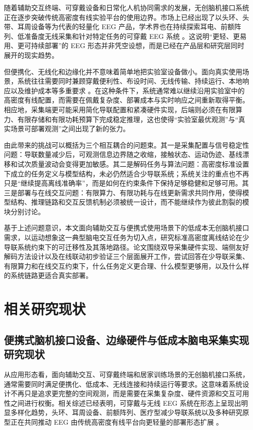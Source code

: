 随着辅助交互终端、可穿戴设备和日常化人机协同需求的发展，无创脑机接口系统正在逐步突破传统高密度有线实验平台的使用边界。市场上已经出现了以头环、头带、耳周设备等为代表的轻量化 EEG 产品，学术界也在持续探索耳电、前额阵列、低准备度无线采集和针对特定任务的可穿戴 EEG 系统 \cite{He23, Nis22, Arn20, Deb15, Bio22}。这说明“更轻、更易用、更可持续部署”的 EEG 形态并非凭空设想，而是已经在产品层和研究层同时展开的现实趋势。

但便携化、无线化和边缘化并不意味着简单地把实验室设备做小。面向真实使用场景，系统往往需要同时兼顾穿戴便利性、布设时间、无线传输、持续运行、本地响应以及维护成本等多重要求 \cite{Cas19c, Nis22, He23}。在这种条件下，系统通常难以继续沿用实验室中的高密度有线配置，而需要在佩戴复杂度、部署成本与实时响应之间重新取得平衡。相应地，采集端更可能采用简化导联配置和紧凑硬件实现，后端则必须在有限算力、有限存储和有限功耗预算下完成稳定推理，这也使得“实验室最优观测”与“真实场景可部署观测”之间出现了新的张力。

由此带来的挑战可以概括为三个相互耦合的问题束。其一是采集配置与信号稳定性问题：导联数量减少后，可观测信息边界随之收缩，接触状态、运动伪迹、基线漂移和试次质量波动会变得更加敏感。其二是解码任务与算法问题：高密度标准设置下成立的任务定义与模型结构，未必仍然适合少导联系统；系统关注的重点也不再只是“继续提高离线准确率”，而是如何在约束条件下保持足够稳健和足够可用。其三是部署与在线交互问题：有限算力、有限功耗与在线更新需求共同作用，使得模型结构、推理链路和交互反馈机制必须被统一设计，而不能继续作为彼此割裂的模块分别讨论。

基于上述问题意识，本文面向辅助交互与便携式使用场景下的低成本无创脑机接口需求，以运动想象这一典型脑电交互任务为切入点，研究标准高密度离线结论在少导联系统约束下的可迁移性及其落地路径。论文围绕双导采集硬件实现、端侧友好解码方法设计以及在线联动初步验证三个层面展开工作，尝试回答在少导联采集、有限算力和在线交互约束下，什么任务定义更合理、什么模型更够用，以及什么样的系统链路更适合真实部署。

\section{相关研究现状}
\subsection{便携式脑机接口设备、边缘硬件与低成本脑电采集实现研究现状}

从应用形态看，面向辅助交互、可穿戴终端和居家训练场景的无创脑机接口系统，通常需要同时满足便携化、低成本、无线连接和持续运行等要求。这意味着系统设计不再只是追求更完整的空间观测，而是需要在采集复杂度、硬件资源和交互可用性之间进行权衡。相关综述已经表明，可穿戴与无线 EEG 系统在形态上呈现出明显多样化趋势，头环、耳周设备、前额阵列、医疗型减少导联系统以及多种研究原型正在共同推动 EEG 由传统高密度有线平台向更轻量的部署形态扩展 \cite{Cas19c, Nis22, He23}。

